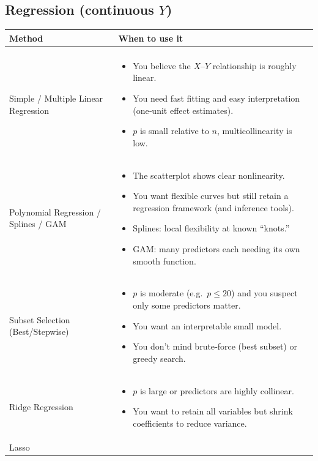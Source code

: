 \documentclass{article}
\begin{document}
\subsection{Regression (continuous \(Y\))}

\begin{tabular}{p{4cm} p{11cm}}
\textbf{Method} & \textbf{When to use it} \\[6pt]
\hline \\[-6pt]
Simple / Multiple Linear Regression &
\begin{itemize}[nosep]
  \item You believe the \(X\)–\(Y\) relationship is roughly linear.
  \item You need fast fitting and easy interpretation (one‐unit effect estimates).
  \item \(p\) is small relative to \(n\), multicollinearity is low.
\end{itemize}
\\[8pt]
Polynomial Regression / Splines / GAM &
\begin{itemize}[nosep]
  \item The scatterplot shows clear nonlinearity.
  \item You want flexible curves but still retain a regression framework (and inference tools).
  \item Splines: local flexibility at known “knots.”
  \item GAM: many predictors each needing its own smooth function.
\end{itemize}
\\[8pt]
Subset Selection (Best/Stepwise) &
\begin{itemize}[nosep]
  \item \(p\) is moderate (e.g.\ \(p\le20\)) and you suspect only some predictors matter.
  \item You want an interpretable small model.
  \item You don’t mind brute‐force (best subset) or greedy search.
\end{itemize}
\\[8pt]
Ridge Regression &
\begin{itemize}[nosep]
  \item \(p\) is large or predictors are highly collinear.
  \item You want to retain all variables but shrink coefficients to reduce variance.
\end{itemize}
\\[8pt]
Lasso &
\begin{itemize}[nosep]

\end{itemize}
\end{tabular}
\end{document}
